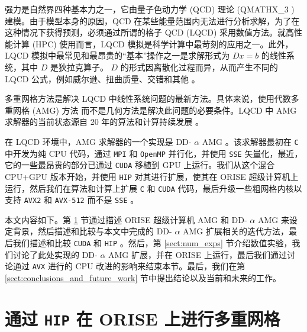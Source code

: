 \documentclass[5p,times,a4paper,fleqn]{cas-dc}
\begin{document}
强力是自然界四种基本力之一，它由量子色动力学 (QCD) 理论 (QMATHX\_3 ) 建模。由于模型本身的原因，QCD 在某些能量范围内无法进行分析求解，为了在这种情况下获得预测，必须通过所谓的格子 QCD (LQCD)    \cite{gattringer2009quantum}    采用数值方法。就高性能计算 (HPC) 使用而言，LQCD 模拟是科学计算中最苛刻的应用之一。此外，LQCD 模拟中最常见和最昂贵的“基本”操作之一是求解形式为    $Dx = b$    的线性系统，其中    $D$    是狄拉克算子。    $D$    的形式因离散化过程而异，从而产生不同的 LQCD 公式，例如威尔逊、扭曲质量、交错和其他    \cite{gattringer2009quantum,wilson1974confinement,frezzotti2000local,kogut1975hamiltonian}    。  

多重网格方法是解决 LQCD 中线性系统问题的最新方法。具体来说，使用代数多重网格 (AMG) 方法    \cite{trottenberg2000multigrid}    而不是几何方法是解决此问题的必要条件。LQCD 中 AMG 求解器的当前状态源自 20 年的算法和计算持续发展    \cite{Babich2010,Brannick2008,
Brower2020,Frommer2014,osborn2010multigrid}    。  

在 LQCD 环境中，AMG 求解器的一个实现是 DD-    $\alpha$    AMG    \cite{rottmann2016adaptive,Frommer2014}    。该求解器最初在    \texttt{C}    中开发为纯 CPU 代码，通过    \texttt{MPI}    和    \texttt{OpenMP}    并行化，并使用    \texttt{SSE}    矢量化，最近，它的一些最昂贵的部分已通过    \texttt{CUDA}    
   \cite{RamirezHidalgo_PhDThesis,arxivAcceleratingLattice}    移植到 GPU 上运行。我们从这个混合 CPU+GPU 版本开始，并使用    \texttt{HIP}    对其进行扩展，使其在 ORISE 超级计算机上运行，然后我们在算法和计算上扩展    \texttt{C}    和    \texttt{CUDA}    代码，最后升级一些粗网格内核以支持    \texttt{AVX2}    和    \texttt{AVX-512}    而不是    \texttt{SSE}    。  

本文内容如下。第    \ref{sect:amg_and_orise}    节通过描述 ORISE 超级计算机 AMG 和 DD-   $\alpha$    AMG 来设定背景，然后描述和比较与本文中完成的 DD-   $\alpha$    AMG 扩展相关的迭代方法，最后我们描述和比较    \texttt{CUDA}    和    \texttt{HIP}   。然后，第    \ref{sect:num_exps}    节介绍数值实验，我们讨论了此处实现的 DD-   $\alpha$    AMG 扩展，并在 ORISE 上运行，最后我们通过讨论通过    \texttt{AVX}    进行的 CPU 改进的影响来结束本节。最后，我们在第    \ref{sect:conclusions_and_future_work}    节中提出结论以及当前和未来的工作。  

   \section{通过    \texttt{HIP}    在 ORISE 上进行多重网格  }       \label{sect:amg_and_orise}     
\end{document}
